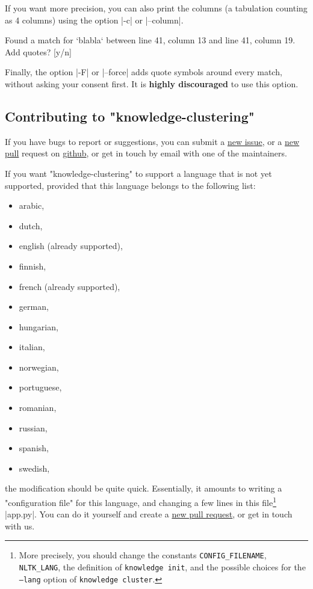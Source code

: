 \documentclass{article}
\begin{document}
If you want more precision,
you can also print the columns (a tabulation counting as 4 columns)
using the option \spverb|-c| or \spverb|--column|.
\begin{spverbatim}
    Found a match for `blabla` between line 41, column 13 and line 41, column 19.
    Add quotes? [y/n]
\end{spverbatim}

Finally, the option \spverb|-F| or \spverb|--force| adds
quote symbols around every match, without asking your consent first.
It is \textbf{highly discouraged} to use this option. 


\subsection{Contributing to "knowledge-clustering"}

If you have bugs to report or suggestions, you can submit a
\href{https://github.com/remimorvan/knowledge-clustering/issues}{new issue},
or a \href{https://github.com/remimorvan/knowledge-examples/pulls}{new pull} 
request on \href{https://github.com/remimorvan/knowledge-examples}{github}, or 
get in touch by email with one of the maintainers.

If you want "knowledge-clustering" to support a language that is not yet 
supported, provided that this language belongs to the following list:
\begin{multicols}{2}
    \begin{itemize}
        \item arabic,
        \item dutch,
        \item english (already supported),
        \item finnish,
        \item french (already supported),
        \item german,
        \item hungarian,
        \item italian,
        \item norwegian,
        \item portuguese,
        \item romanian,
        \item russian,
        \item spanish,
        \item swedish,
    \end{itemize}
\end{multicols}
the modification should be quite quick. Essentially, it amounts to writing a
"configuration file" for this language, and changing a few lines
in this file\footnote{More precisely, you should change the constants
\texttt{CONFIG\_FILENAME}, \texttt{NLTK\_LANG}, the definition of
\texttt{knowledge init}, and the possible choices for the \texttt{--lang}
option of \texttt{knowledge cluster}.} \spverb|app.py|.
You can do it yourself and create a \href{https://github.com/remimorvan/knowledge-clustering/pulls}{new pull request},
or get in touch with us.
\end{document}
